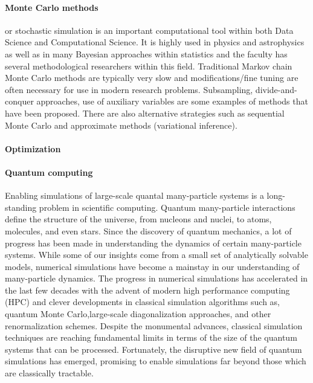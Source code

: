 \documentclass[a4paper,10pt]{article}
\begin{document}
\paragraph{Monte Carlo methods} or stochastic simulation is an important computational tool within both Data Science and Computational Science. It is highly used in physics and astrophysics as well as in many Bayesian approaches within statistics and the faculty has several methodological researchers within this field. Traditional Markov chain Monte Carlo methods are typically very slow and modifications/fine tuning are often necessary for use in modern research problems. Subsampling, divide-and-conquer approaches, use of auxiliary variables 
are some examples of methods that have been proposed. There are also alternative strategies such as sequential Monte Carlo and approximate methods (variational inference).

\paragraph{Optimization}


\paragraph{Quantum computing} Enabling simulations of large-scale quantal many-particle systems is a long-standing problem in scientific computing. Quantum many-particle interactions define the structure of the universe, from nucleons and nuclei, to atoms, molecules, and even stars. Since the discovery of quantum mechanics, a lot of progress has been made in understanding the dynamics of certain many-particle systems. While some of our insights come from a small set of analytically solvable models, numerical simulations have become a mainstay in our understanding of many-particle dynamics. The progress in numerical simulations has accelerated in the last few decades with the advent of modern high performance computing (HPC) and clever developments in classical simulation algorithms such as, quantum Monte Carlo,large-scale diagonalization approaches, and other renormalization schemes. Despite the monumental advances, classical simulation techniques are reaching fundamental limits in terms of the size of the quantum systems that can be processed. Fortunately, the disruptive new field of quantum simulations has emerged, promising to enable simulations far beyond those which are classically tractable. 
\end{document}
